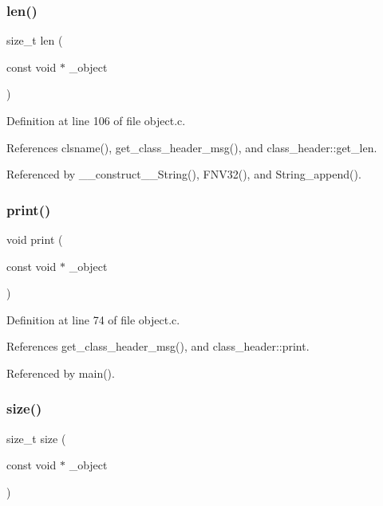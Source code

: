 \mbox{\label{group__common_ga15be7f4a5b9c979feb83b76278f6716c}} 
\subsubsection{\texorpdfstring{len()}{len()}}
{\footnotesize\ttfamily size\+\_\+t len (\begin{DoxyParamCaption}\item[{const void $\ast$}]{\+\_\+object }\end{DoxyParamCaption})}



Definition at line 106 of file object.\+c.



References clsname(), get\+\_\+class\+\_\+header\+\_\+msg(), and class\+\_\+header\+::get\+\_\+len.



Referenced by \+\_\+\+\_\+construct\+\_\+\+\_\+\+String(), F\+N\+V32(), and String\+\_\+append().

\mbox{\label{group__common_ga34dc6ab72cfd51381e8173226484e827}} 
\subsubsection{\texorpdfstring{print()}{print()}}
{\footnotesize\ttfamily void print (\begin{DoxyParamCaption}\item[{const void $\ast$}]{\+\_\+object }\end{DoxyParamCaption})}



Definition at line 74 of file object.\+c.



References get\+\_\+class\+\_\+header\+\_\+msg(), and class\+\_\+header\+::print.



Referenced by main().

\mbox{\label{group__common_gafac8564ed88a6f8585f043fc6b2fa7e1}} 
\subsubsection{\texorpdfstring{size()}{size()}}
{\footnotesize\ttfamily size\+\_\+t size (\begin{DoxyParamCaption}\item[{const void $\ast$}]{\+\_\+object }\end{DoxyParamCaption})}




